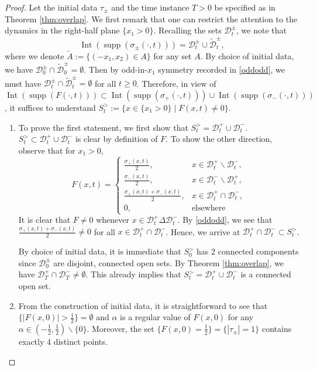 \documentclass[11pt,reqno]{amsproc}
\newcommand{\calD}{\mathcal{D}}
\DeclareMathOperator{\supp}{supp}
\DeclareMathOperator{\Int}{Int}
\begin{document}
\begin{proof}
Let the initial data $\tau_\pm$ and the time instance $T > 0$ be specified as in Theorem \ref{thm:overlap}. We first remark that one can restrict the attention to the dynamics in the right-half plane $\{x_1 > 0\}$. Recalling the sets $\calD_t^\pm$, we note that
$$
\Int(\supp(\sigma_\pm(\cdot,t))) = \calD_t^\pm \cup \tilde{\calD}_t^\pm,
$$
where we denote $\tilde{A} := \{(-x_1, x_2) \in A\}$ for any set $A$. By choice of initial data, we have $\calD_0^\pm \cap \tilde{\calD}_0^\pm = \emptyset$. Then by odd-in-$x_1$ symmetry recorded in \eqref{oddodd}, we must have $\calD_t^\pm \cap \tilde{\calD}_t^\pm = \emptyset$ for all $t \ge 0$. Therefore, in view of $\Int(\supp(F(\cdot,t))) \subset \Int(\supp(\sigma_+(\cdot,t))) \cup \Int(\supp(\sigma_-(\cdot,t)))$, it suffices to understand $S_t^> := \{x \in \{x_1 > 0\}\;|\;F(x,t) \neq 0\}$.
    \begin{enumerate}
        \item To prove the first statement, we first show that $S_t^> = \calD_t^+ \cup \calD_t^-$. $S_t^> \subset \calD_t^+ \cup \calD_t^-$ is clear by definition of $F$. To show the other direction, observe that for $x_1 > 0$,
        $$
        F(x,t) = 
        \begin{cases}
            \frac{\sigma_+(x,t)}{2},& x\in \calD_t^+ \backslash \calD_t^-,\\
            \frac{\sigma_-(x,t)}{2},& x\in \calD_t^- \backslash \calD_t^+,\\
            \frac{\sigma_+(x,t) + \sigma_-(x,t)}{2},& x\in \calD_t^+ \cap \calD_t^-,\\
            0,& \text{elsewhere}
        \end{cases}
        $$
        It is clear that $F \neq 0$ whenever $x \in \calD_t^+ \Delta \calD_t^-$. By \eqref{oddodd}, we see that $\frac{\sigma_+(x,t) + \sigma_-(x,t)}{2} \neq 0$ for all $x\in \calD_t^+ \cap \calD_t^-$. Hence, we arrive at $\calD_t^+ \cap \calD_t^- \subset S_t^>$.

        By choice of initial data, it is immediate that $S_0^>$ has 2 connected components since $\calD_0^\pm$ are disjoint, connected open sets. By Theorem \ref{thm:overlap}, we have $\calD_T^+ \cap \calD_T^- \neq \emptyset$. This already implies that $S_t^>= \calD_t^+ \cup \calD_t^-$ is a connected open set.
        \item From the construction of initial data, it is straightforward to see that $\{|F(x,0)| > \frac12\} = \emptyset$ and $\alpha$ is a regular value of $F(x,0)$ for any $\alpha \in (-\frac12,\frac12)\backslash\{0\}$. Moreover, the set $\{F(x,0) = \frac12\} = \{|\tau_\pm| = 1\}$ contains exactly 4 distinct points. 
        

\end{enumerate}
\end{proof}
\end{document}
